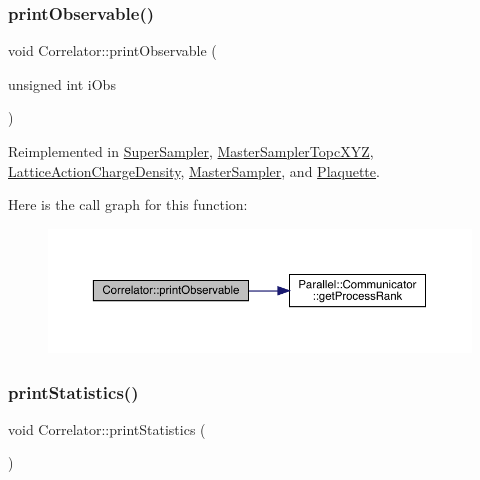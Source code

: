 \mbox{\label{class_correlator_a15744ddb9f2b71fff34ac762d101df38}} 
\subsubsection{\texorpdfstring{printObservable()}{printObservable()}}
{\footnotesize\ttfamily void Correlator\+::print\+Observable (\begin{DoxyParamCaption}\item[{unsigned int}]{i\+Obs }\end{DoxyParamCaption})\hspace{0.3cm}{\ttfamily [virtual]}}



Reimplemented in \mbox{\hyperlink{class_super_sampler_adf92b9281ee9a782e6c00424dd23451d}{Super\+Sampler}}, \mbox{\hyperlink{class_master_sampler_topc_x_y_z_ab2312c9e9dc1e9deeb5bce36784372ac}{Master\+Sampler\+Topc\+X\+YZ}}, \mbox{\hyperlink{class_lattice_action_charge_density_abb7db718d4069faab0ed19f31aa85ad4}{Lattice\+Action\+Charge\+Density}}, \mbox{\hyperlink{class_master_sampler_a41853c3e4ab52fca7d93cf80e8702b7a}{Master\+Sampler}}, and \mbox{\hyperlink{class_plaquette_aa15bf42749c9fd995d4d572ca3ed4f22}{Plaquette}}.

Here is the call graph for this function\+:\nopagebreak
\begin{figure}[H]
\begin{center}
\leavevmode
\includegraphics[width=350pt]{class_correlator_a15744ddb9f2b71fff34ac762d101df38_cgraph}
\end{center}
\end{figure}
\mbox{\label{class_correlator_a2168d677f547769784781d2e2aaa53cf}} 
\subsubsection{\texorpdfstring{printStatistics()}{printStatistics()}}
{\footnotesize\ttfamily void Correlator\+::print\+Statistics (\begin{DoxyParamCaption}{ }\end{DoxyParamCaption})\hspace{0.3cm}{\ttfamily [virtual]}}



